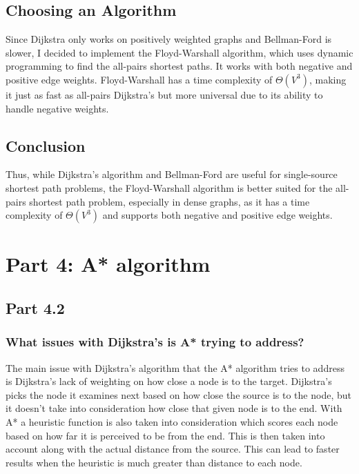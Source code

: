 \documentclass[12pt]{article}
\begin{document}
\subsection*{Choosing an Algorithm} 
Since Dijkstra only works on positively weighted graphs and Bellman-Ford is slower, I decided to implement the Floyd-Warshall algorithm, which uses dynamic programming to find the all-pairs shortest paths. It works with both negative and positive edge weights. \newline
\newline
Floyd-Warshall has a time complexity of \(\Theta(V^3)\), making it just as fast as all-pairs Dijkstra’s but more universal due to its ability to handle negative weights.

\subsection*{Conclusion}
Thus, while Dijkstra’s algorithm and Bellman-Ford are useful for single-source shortest path problems, the Floyd-Warshall algorithm is better suited for the all-pairs shortest path problem, especially in dense graphs, as it has a time complexity of \(\Theta(V^3)\) and supports both negative and positive edge weights.

\newpage
\section*{Part 4: A* algorithm}

\subsection*{Part 4.2}
\subsubsection*{What issues with Dijkstra's is A* trying to address?}
The main issue with Dijkstra's algorithm that the A* algorithm tries to address is Dijkstra's lack of
weighting on how close a node is to the target. Dijkstra's picks the node it examines next based on how close 
the source is to the node, but it doesn't take into consideration how close that given node is to the end.
With A* a heuristic function is also taken into consideration which scores each node based on how far it is
perceived to be from the end. This is then taken into account along with the actual distance from the source.
This can lead to faster results when the heuristic is much greater than distance to each node.
\end{document}

